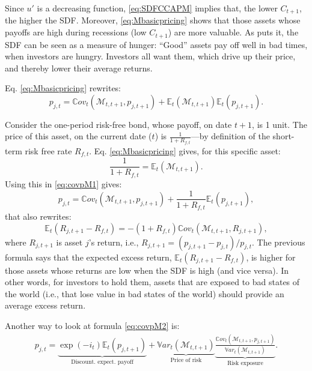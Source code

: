 \documentclass[
  12pt,
]{book}
\theoremstyle{definition}
\theoremstyle{definition}
\theoremstyle{definition}
\theoremstyle{definition}
\theoremstyle{remark}
\begin{document}
Since \(u'\) is a decreasing function, \eqref{eq:SDFCCAPM} implies that, the lower \(C_{t+1}\), the higher the SDF. Moreover, \eqref{eq:Mbasicpricing} shows that those assets whose payoffs are high during recessions (low \(C_{t+1}\)) are more valuable. As \citet{Cochrane_2005} puts it, the SDF can be seen as a measure of hunger: ``Good'' assets pay off well in bad times, when investors are hungry. Investors all want them, which drive up their price, and thereby lower their average returns.

Eq. \eqref{eq:Mbasicpricing} rewrites:
\begin{equation}
p_{j,t} = \mathbb{C}ov_t(\mathcal{M}_{t,t+1},p_{j,t+1}) +\mathbb{E}_t(\mathcal{M}_{t,t+1})\mathbb{E}_t(p_{j,t+1}).\label{eq:covpM1}
\end{equation}

Consider the one-period risk-free bond, whose payoff, on date \(t+1\), is 1 unit. The price of this asset, on the current date (\(t\)) is \(\frac{1}{1+R_{f,t}}\)---by definition of the short-term risk free rate \(R_{f,t}\). Eq. \eqref{eq:Mbasicpricing} gives, for this specific asset:
\[
\frac{1}{1+R_{f,t}} = \mathbb{E}_t(\mathcal{M}_{t,t+1}).
\]
Using this in \eqref{eq:covpM1} gives:
\begin{equation}
p_{j,t} = \mathbb{C}ov_t(\mathcal{M}_{t,t+1},p_{j,t+1}) +\frac{1}{1+R_{f,t}}\mathbb{E}_t(p_{j,t+1}),\label{eq:covpM2}
\end{equation}
that also rewrites:
\begin{equation}
\boxed{\mathbb{E}_t(R_{j,t+1} - R_{f,t}) = - (1 + R_{f,t}) \mathbb{C}ov_t(\mathcal{M}_{t,t+1},R_{j,t+1}),}\label{eq:MRCov}
\end{equation}
where \(R_{j,t+1}\) is asset \(j\)'s return, i.e., \(R_{j,t+1} = (p_{j,t+1} - p_{j,t})/p_{j,t}\). The previous formula says that the expected excess return, \(\mathbb{E}_t(R_{j,t+1} - R_{f,t})\), is higher for those assets whose returns are low when the SDF is high (and vice versa). In other words, for investors to hold them, assets that are exposed to bad states of the world (i.e., that lose value in bad states of the world) should provide an average excess return.

Another way to look at formula \eqref{eq:covpM2} is:
\begin{eqnarray*}
p_{j,t} = \underbrace{\exp(-i_t) \mathbb{E}_t(p_{j,t+1})}_{\mbox{Discount.  expect. payoff}} + \underbrace{\mathbb{V}ar_t(\mathcal{M}_{t,t+1})}_{\mbox{Price of risk}} \underbrace{\frac{\mathbb{C}ov_t(\mathcal{M}_{t,t+1},p_{j,t+1})}{\mathbb{V}ar_t(\mathcal{M}_{t,t+1})}}_{\mbox{Risk exposure}}.
\end{eqnarray*}
\end{document}
